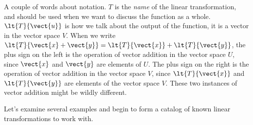 %
%
A couple of words about notation.  $T$ is the {\em name} of the linear transformation, and should be used when we want to discuss the function as a whole.  $\lt{T}{\vect{u}}$ is how we talk about the output of the function, it is a vector in the vector space $V$.  When we write $\lt{T}{\vect{x}+\vect{y}}=\lt{T}{\vect{x}}+\lt{T}{\vect{y}}$, the plus sign on the left is the operation of vector addition in the vector space $U$, since $\vect{x}$ and $\vect{y}$ are elements of $U$.  The plus sign on the right is the operation of vector addition in the vector space $V$, since $\lt{T}{\vect{x}}$ and $\lt{T}{\vect{y}}$ are elements of the vector space $V$.  These two instances of vector addition might be wildly different.\par
%
Let's examine several examples and begin to form a catalog of known linear transformations to work with.
%
